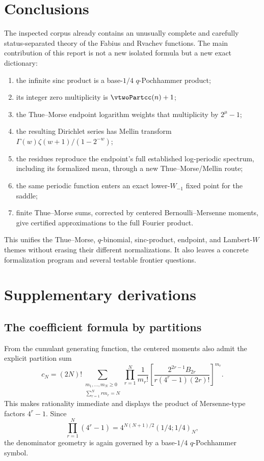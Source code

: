 \documentclass[11pt]{article}
\numberwithin{equation}{section}
\theoremstyle{definition}
\theoremstyle{remark}
\begin{document}
\section{Conclusions}
The inspected corpus already contains an unusually complete and carefully status-separated
theory of the Fabius and Rvachev functions.  The main contribution of this report is not a
new isolated formula but a new exact dictionary:
\begin{enumerate}
\item the infinite sinc product is a base-$1/4$ $q$-Pochhammer product;
\item its integer zero multiplicity is $\vtwoPartcc(n)+1$;
\item the Thue--Morse endpoint logarithm weights that multiplicity by $2^\mu-1$;
\item the resulting Dirichlet series has Mellin transform
$\Gamma(w)\zeta(w+1)/(1-2^{-w})$;
\item the residues reproduce the endpoint's full established log-periodic spectrum,
including its formalized mean, through a new Thue--Morse/Mellin route;
\item the same periodic function enters an exact lower-$W_{-1}$ fixed point for the saddle;
\item finite Thue--Morse sums, corrected by centered Bernoulli--Mersenne moments, give
certified approximations to the full Fourier product.
\end{enumerate}
This unifies the Thue--Morse, $q$-binomial, sinc-product, endpoint, and Lambert-$W$ themes
without erasing their different normalizations.  It also leaves a concrete formalization
program and several testable frontier questions.

\appendix
\renewcommand*{\theHsection}{\arabic{part}.\arabic{section}}
\section{Supplementary derivations}

\subsection{The coefficient formula by partitions}
From the cumulant generating function, the centered moments also admit the explicit
partition sum
\begin{equation}
 c_N=(2N)!\!\sum_{\substack{m_1,\ldots,m_N\ge0\\
                    \sum_{r=1}^Nrm_r=N}}
 \prod_{r=1}^N\frac1{m_r!}
 \left[
  \frac{2^{2r-1}B_{2r}}{r(4^r-1)(2r)!}
 \right]^{m_r}.                                            \label{p9:eq:partition-moments}
\end{equation}
This makes rationality immediate and displays the product of Mersenne-type factors
$4^r-1$.  Since
\[
 \prod_{r=1}^N(4^r-1)=4^{N(N+1)/2}(1/4;1/4)_N,
\]
the denominator geometry is again governed by a base-$1/4$ $q$-Pochhammer symbol.
\end{document}
